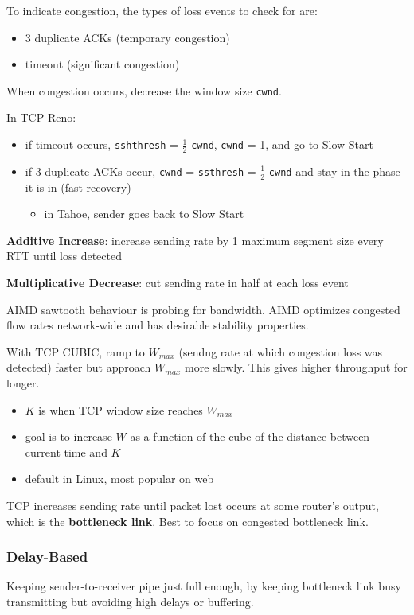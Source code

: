 \documentclass[11pt]{article}
\begin{document}
To indicate congestion, the types of loss events to check for are:
\begin{itemize}
\item 3 duplicate ACKs (temporary congestion)
\item timeout (significant congestion)
\end{itemize}

When congestion occurs, decrease the window size \texttt{cwnd}.

In TCP Reno:
\begin{itemize}
\item if timeout occurs, \texttt{sshthresh} = \(\frac{1}{2}\) \texttt{cwnd}, \texttt{cwnd} = 1, and go to
Slow Start
\item if 3 duplicate ACKs occur, \texttt{cwnd} = \texttt{ssthresh} = \(\frac{1}{2}\) \texttt{cwnd} and stay
in the phase it is in (\uline{fast recovery})
\begin{itemize}
\item in Tahoe, sender goes back to Slow Start
\end{itemize}
\end{itemize}

\textbf{Additive Increase}: increase sending rate by 1 maximum segment size every RTT
until loss detected

\textbf{Multiplicative Decrease}: cut sending rate in half at each loss event

AIMD sawtooth behaviour is probing for bandwidth.
AIMD optimizes congested flow rates network-wide and has desirable stability
properties.

With TCP CUBIC, ramp to \(W_{max}\) (sendng rate at which congestion loss was
detected) faster but approach \(W_{max}\) more slowly.
This gives higher throughput for longer.
\begin{itemize}
\item \(K\) is when TCP window size reaches \(W_{max}\)
\item goal is to increase \(W\) as a function of the cube of the distance between
current time and \(K\)
\item default in Linux, most popular on web
\end{itemize}

TCP increases sending rate until packet lost occurs at some router's output,
which is the \textbf{bottleneck link}.
Best to focus on congested bottleneck link.
\subsubsection{Delay-Based}
\label{sec:org3e71d07}
Keeping sender-to-receiver pipe just full enough, by keeping bottleneck link
busy transmitting but avoiding high delays or buffering.
\end{document}
